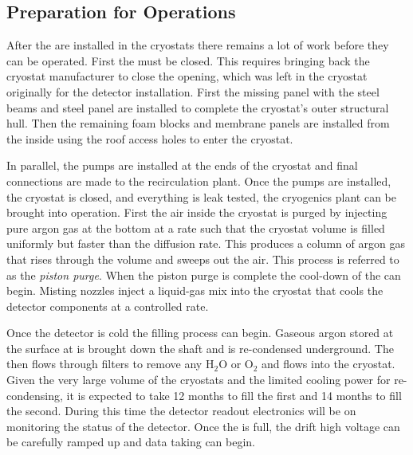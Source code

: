 %

\subsection{Preparation for Operations}

After the  are installed in the cryostats there remains a lot
of work before they can be operated. First the 
must be closed. This requires bringing back the cryostat manufacturer
to close the opening, which was left in the cryostat originally for the
detector installation.  First the missing panel with the steel beams
and steel panel are installed to complete the cryostat's outer
structural hull. Then the remaining foam blocks and membrane panels
are installed from the inside using the roof access holes 
  to enter the
cryostat. 

In parallel, the \lar pumps are installed at
the ends of the cryostat and final connections are made to the
recirculation plant. Once the pumps are installed, the cryostat is
closed, and everything is leak tested, the cryogenics plant can be
brought into operation. First the air inside the cryostat is purged by
injecting pure argon gas at the bottom %
at a rate such
that the %
cryostat volume is filled uniformly but faster than the diffusion
rate. This produces a column of argon gas that rises through the volume %
and sweeps out the air. This process is referred to as the \textit{piston
purge}. When the piston purge is complete the cool-down of the 
can begin. Misting nozzles inject a liquid-gas mix into the cryostat
that cools the detector components at a controlled rate. 

Once the detector is
cold the filling process can begin. Gaseous argon stored at the surface 
at \surf is brought down the shaft and is re-condensed underground. The \lar then flows through filters to remove any H$_2$O or O$_2$ and
flows into the cryostat. Given the very large volume of the cryostats
and the limited cooling power for re-condensing, it is  %
expected to take \num{12} months to fill the first  and \num{14} months to
fill the second. During this time the detector readout electronics
will be on monitoring the status of the detector. %
Once the
 is full, the drift high voltage can be carefully ramped up and
data taking can begin.



